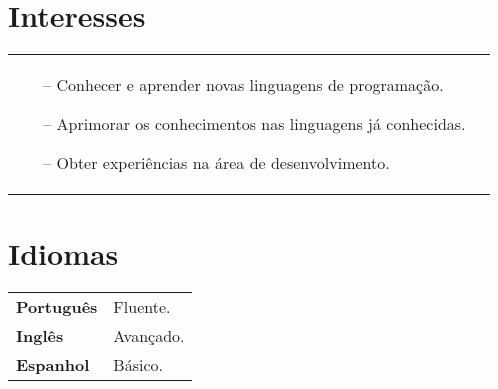 \documentclass[a4paper,12pt]{article}
\begin{document}
\begin{multicols}{2}
\section{Interesses}
\begin{tabularx}{\linewidth}{@{}l l@{}}
\begin{minipage}[t]{\linewidth}
    \begin{itemize}[nosep,after=\strut, leftmargin=1em, itemsep=3pt]
        \item[--] Conhecer e aprender novas linguagens de programação.
        \item[--] Aprimorar os conhecimentos nas linguagens já conhecidas.
        \item[--] Obter experiências na área de desenvolvimento.
    \end{itemize}
    \end{minipage}
\end{tabularx}
\section{Idiomas}
\begin{tabularx}{\linewidth}{@{}l l@{}}
\textbf{Português} & \normalsize{Fluente.}\\
\textbf{Inglês} & \normalsize{Avançado.}\\
\textbf{Espanhol} & \normalsize{Básico.}\\
\end{tabularx}
\end{multicols}

\vfill
{}
\end{document}
